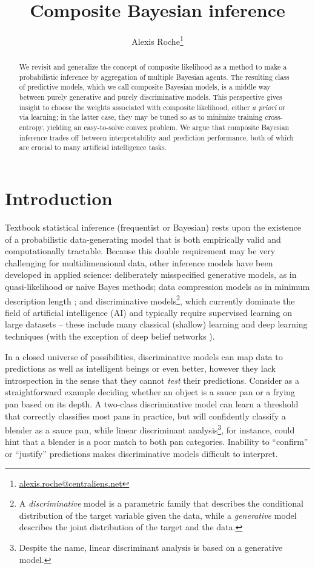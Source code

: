 \documentclass[english]{scrartcl}
\title{Composite Bayesian inference}
\author{Alexis Roche\thanks{\url{alexis.roche@centraliens.net}}}
\begin{document}
\maketitle

\begin{abstract}
We revisit and generalize the concept of composite likelihood as a method to make a probabilistic inference by aggregation of multiple Bayesian agents. The resulting class of predictive models, which we call composite Bayesian models, is a middle way between purely generative and purely discriminative models. This perspective gives insight to choose the weights associated with composite likelihood, either {\em a priori} or via learning; in the latter case, they may be tuned so as to minimize training cross-entropy, yielding an easy-to-solve convex problem. We argue that composite Bayesian inference trades off between interpretability and prediction performance, both of which are crucial to many artificial intelligence tasks.
\end{abstract}


\section{Introduction}
\label{sec:intro}

Textbook statistical inference (frequentist or Bayesian) rests upon the existence of a probabilistic data-generating model that is both empirically valid and computationally tractable. Because this double requirement may be very challenging for multidimensional data, other inference models have been developed in applied science: deliberately misspecified generative models, as in quasi-likelihood \cite{White-82,Walker-13} or na\"ive Bayes \cite{Ng-01} methods; data compression models as in minimum description length \cite{Grunwald-07}; and discriminative models\footnote{A {\em discriminative} model is a parametric family that describes the conditional distribution of the target variable given the data, while a {\em generative} model describes the joint distribution of the target and the data.}, which currently dominate the field of artificial intelligence (AI) and typically require supervised learning on large datasets -- these include many classical (shallow) learning \cite{Ho-95,BergerA-96,Vapnik-00,Rasmussen-06} and deep learning \cite{Lecun-15,Goodfellow-16} techniques (with the exception of deep belief networks \cite{Hinton-06}).

In a closed universe of possibilities, discriminative models can map data to predictions as well as intelligent beings or even better, however they lack introspection in the sense that they cannot {\em test} their predictions. Consider as a straightforward example deciding whether an object is a sauce pan or a frying pan based on its depth. A two-class discriminative model can learn a threshold that correctly classifies most pans in practice, but will confidently classify a blender as a sauce pan, while linear discriminant analysis\footnote{Despite the name, linear discriminant analysis is based on a generative model.}, for instance, could hint that a blender is a poor match to both pan categories. Inability to ``confirm'' or ``justify'' predictions makes discriminative models difficult to interpret.
\end{document}

